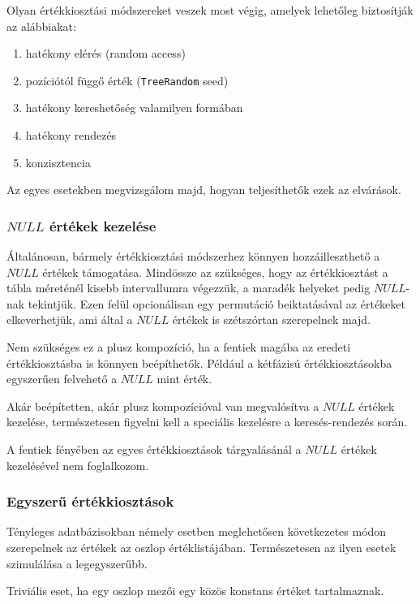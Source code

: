 \documentclass[
    parspace,
    noindent,
    nohyp,
]{elteiktdk}[2023/04/10]
\begin{document}
Olyan értékkiosztási módszereket veszek most végig,
amelyek lehetőleg biztosítják az alábbiakat:

\begin{enumerate}
  \item hatékony elérés (random access)
  \item pozíciótól függő érték (\texttt{TreeRandom} seed)
  \item hatékony kereshetőség valamilyen formában
  \item hatékony rendezés
  \item konzisztencia
\end{enumerate}

Az egyes esetekben megvizsgálom majd, hogyan teljesíthetők ezek az elvárások.

\subsubsection{$NULL$ értékek kezelése}

Általánosan, bármely értékkiosztási módszerhez könnyen hozzáilleszthető a $NULL$ értékek támogatása.
Mindössze az szükséges, hogy az értékkiosztást a tábla méreténél kisebb intervallumra végezzük,
a maradék helyeket pedig $NULL$-nak tekintjük.
Ezen felül opcionálisan egy permutáció beiktatásával az értékeket elkeverhetjük,
ami által a $NULL$ értékek is szétszórtan szerepelnek majd.

Nem szükséges ez a plusz kompozíció,
ha a fentiek magába az eredeti értékkiosztásba is könnyen beépíthetők.
Például a kétfázisú értékkiosztásokba egyszerűen felvehető a $NULL$ mint érték.

Akár beépítetten, akár plusz kompozícióval van megvalósítva a $NULL$ értékek kezelése,
természetesen figyelni kell a speciális kezelésre a keresés-rendezés során.

A fentiek fényében az egyes értékkiosztások tárgyalásánál a $NULL$ értékek kezelésével nem foglalkozom.

\subsubsection{Egyszerű értékkiosztások}

Tényleges adatbázisokban némely esetben meglehetősen következetes módon
szerepelnek az értékek az oszlop értéklistájában.
Természetesen az ilyen esetek szimulálása a legegyszerűbb.

Triviális eset, ha egy oszlop mezői egy közös konstans értéket tartalmaznak.
\end{document}
